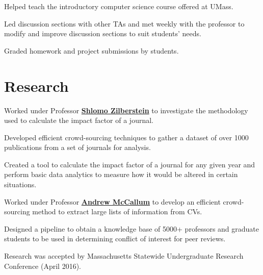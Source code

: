 \documentclass[letterpaper]{deedy-resume} %
\begin{document}
\begin{minipage}[t]{0.65\textwidth}
\sectionspace %
\begin{tightitemize}
\item Helped teach the introductory computer science course offered at UMass.
\item Led discussion sections with other TAs and met weekly with the professor to modify and improve discussion sections to suit students’ needs.
\item Graded homework and project submissions by students.
\end{tightitemize}





\section{Research}


\begin{tightitemize}
\item Worked under Professor \textbf{\href{http://rbr.cs.umass.edu/shlomo/}{Shlomo Zilberstein}} to investigate the methodology used to calculate the impact factor of a journal.
\item Developed efficient crowd-sourcing techniques to gather a dataset of over 1000 publications from a set of journals for analysis.
\item Created a tool to calculate the impact factor of a journal for any given year and perform basic data analytics to measure how it would be altered in certain situations.
\end{tightitemize}
\sectionspace %



\begin{tightitemize}
\item Worked under Professor \textbf{\href{https://people.cs.umass.edu/~mccallum/}{Andrew McCallum}} to develop an efficient crowd-sourcing method to extract large lists of information from CVs.
\item Designed a pipeline to obtain a knowledge base of 5000+ professors and graduate students to be used in determining conflict of interest for peer reviews.
\item Research was accepted by Massachusetts Statewide Undergraduate Research Conference (April 2016).
\end{tightitemize}


\end{minipage}
\end{document}

